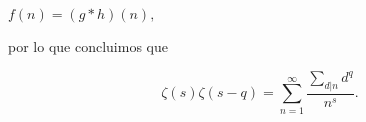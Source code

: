 \documentclass[letterpaper]{article}
\newcommand{\pars}[1]{\left( #1 \right) }
\newcommand{\1}{\mathbbm{1}}
\begin{document}
\begin{enumerate}
\begin{enumerate}
			$f(n) = (g*h)(n),$

			por lo que concluimos que

			\[\zeta\pars{s}\zeta\pars{s-q} = \sum_{n=1}^{\infty} \frac{\sum_{d|n} d^q}{n^{s}}.\]
		\end{enumerate}

    \end{enumerate}

	
\end{document}
